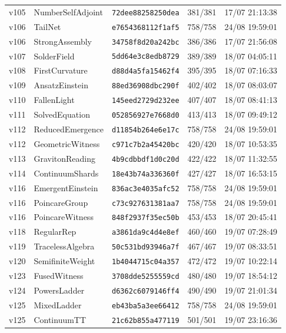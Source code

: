 \documentclass[11pt]{article}
\theoremstyle{definition}\newtheorem{deriv}{Derivation}
\begin{document}
{\begin{longtable}{@{}lllll@{}}
v105 & NumberSelfAdjoint & \texttt{72dee88258250dea} & 381/381 & 17/07 21:13:38 \\
v106 & TailNet & \texttt{e7654368112f1af5} & 758/758 & 24/08 19:59:01 \\
v106 & StrongAssembly & \texttt{34758f8d20a242bc} & 386/386 & 17/07 21:56:08 \\
v107 & SolderField & \texttt{5dd64e3c8edb8729} & 389/389 & 18/07 04:05:11 \\
v108 & FirstCurvature & \texttt{d88d4a5fa15462f4} & 395/395 & 18/07 07:16:33 \\
v109 & AnsatzEinstein & \texttt{88ed36908dbc290f} & 402/402 & 18/07 08:03:07 \\
v110 & FallenLight & \texttt{145eed2729d232ee} & 407/407 & 18/07 08:41:13 \\
v111 & SolvedEquation & \texttt{052856927e7668d0} & 413/413 & 18/07 09:49:12 \\
v112 & ReducedEmergence & \texttt{d11854b264e6e17c} & 758/758 & 24/08 19:59:01 \\
v112 & GeometricWitness & \texttt{c971c7b2a45420bc} & 420/420 & 18/07 10:53:35 \\
v113 & GravitonReading & \texttt{4b9cdbbdf1d0c20d} & 422/422 & 18/07 11:32:55 \\
v114 & ContinuumShards & \texttt{18e43b74a336360f} & 427/427 & 18/07 16:53:15 \\
v116 & EmergentEinstein & \texttt{836ac3e4035afc52} & 758/758 & 24/08 19:59:01 \\
v116 & PoincareGroup & \texttt{c73c927631381aa7} & 758/758 & 24/08 19:59:01 \\
v116 & PoincareWitness & \texttt{848f2937f35ec50b} & 453/453 & 18/07 20:45:41 \\
v118 & RegularRep & \texttt{a3861da9c4d4e8ef} & 460/460 & 19/07 07:28:49 \\
v119 & TracelessAlgebra & \texttt{50c531bd93946a7f} & 467/467 & 19/07 08:33:51 \\
v120 & SemifiniteWeight & \texttt{1b4044715c04a357} & 472/472 & 19/07 10:22:14 \\
v123 & FusedWitness & \texttt{3708dde5255559cd} & 480/480 & 19/07 18:54:12 \\
v124 & PowersLadder & \texttt{d6362c6079146ff4} & 490/490 & 19/07 21:01:34 \\
v125 & MixedLadder & \texttt{eb43ba5a3ee66412} & 758/758 & 24/08 19:59:01 \\
v125 & ContinuumTT & \texttt{21c62b855a477119} & 501/501 & 19/07 23:16:36 \\

\end{longtable}}
\end{document}
